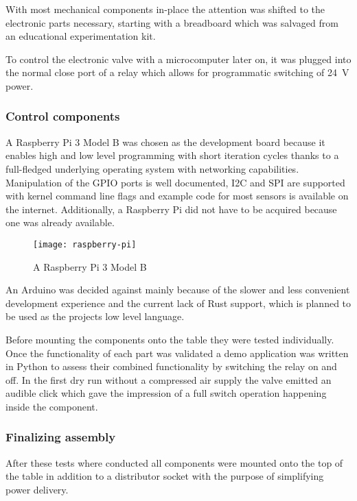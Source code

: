 With most mechanical components in-place the attention was shifted to the electronic parts necessary, starting with a breadboard which was salvaged from an educational experimentation kit. 

To control the electronic valve with a microcomputer later on, it was plugged into the normal close port of a relay which allows for programmatic switching of \SI{24}{\volt} power. 

\subsubsection{Control components}
A Raspberry Pi 3 Model B \cite{raspberry-pi} was chosen as the development board because it enables high and low level programming with short iteration cycles thanks to a full-fledged underlying operating system \cite{raspbian} with networking capabilities. Manipulation of the GPIO ports is well documented, I2C and SPI are supported with kernel command line flags and example code for most sensors is available on the internet. Additionally, a Raspberry Pi did not have to be acquired because one was already available.

\begin{figure}[h]
\centering

\texttt{[image: raspberry-pi]}

\caption{A Raspberry Pi 3 Model B}
\end{figure}

An Arduino was decided against mainly because of the slower and less convenient development experience and the current lack of Rust \cite{rust} support, which is planned to be used as the projects low level language.

Before mounting the components onto the table they were tested individually. Once the functionality of each part was validated a demo application was written in Python to assess their combined functionality by switching the relay on and off. In the first dry run without a compressed air supply the valve emitted an audible click which gave the impression of a full switch operation happening inside the component.

\subsubsection{Finalizing assembly}
After these tests where conducted all components were mounted onto the top of the table in addition to a distributor socket with the purpose of simplifying power delivery.

